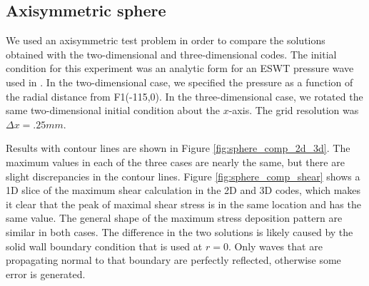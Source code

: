 \documentclass{article}
\begin{document}
\subsection{Axisymmetric sphere}
\label{sec:sphere}
We used an axisymmetric test problem in order to compare the solutions obtained with the two-dimensional and three-dimensional codes.  The initial condition for this experiment was an analytic form for an ESWT pressure wave used in \cite{bailey_oleg}.  In the two-dimensional case, we specified the pressure as a function of the radial distance from F1(-115,0).  In the three-dimensional case, we rotated the same two-dimensional initial condition about the $x$-axis.  The grid resolution was $\Delta x = .25 mm$.  

Results with contour lines are shown in Figure \ref{fig:sphere_comp_2d_3d}.  The
maximum values in each of the three cases are nearly the same, but there are
slight discrepancies in the contour lines.  Figure
\ref{fig:sphere_comp_shear} shows a 1D slice of the maximum shear
calculation in the 2D and 3D codes, which makes it clear that the peak of maximal shear stress is in the same location and has the same value.  The general shape of the maximum stress deposition pattern are similar in both cases.  The difference in the two solutions is likely caused by the solid wall boundary condition that is used at $r=0$.  Only waves that are propagating normal to that boundary are perfectly reflected, otherwise some error is generated.  
\end{document}
